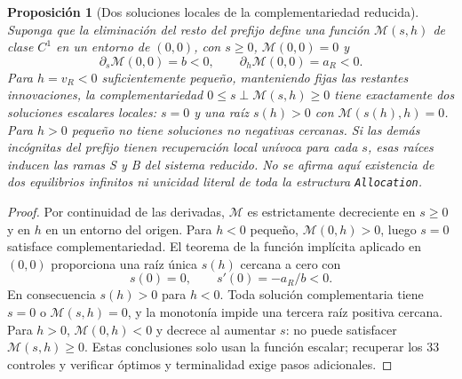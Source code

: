 \documentclass[11pt,a4paper]{article}
\numberwithin{equation}{section}
\newtheorem{proposition}{Proposición}[section]
\theoremstyle{definition}
\begin{document}
\begin{proposition}[Dos soluciones locales de la complementariedad reducida]\label{prop:local_macro_multiplicity}
Suponga que la eliminación del resto del prefijo define una función
$\mathcal M(s,h)$ de clase $C^1$ en un entorno de $(0,0)$,
con $s\geq0$, $\mathcal M(0,0)=0$ y
\[
\partial_s\mathcal M(0,0)=b<0,\qquad
\partial_h\mathcal M(0,0)=a_R<0.
\]
Para $h=v_R<0$ suficientemente pequeño, manteniendo fijas
las restantes innovaciones, la complementariedad
$0\leq s\perp\mathcal M(s,h)\geq0$ tiene exactamente dos
\emph{soluciones escalares locales}: $s=0$ y
una raíz $s(h)>0$ con $\mathcal M(s(h),h)=0$.
Para $h>0$ pequeño no tiene soluciones no negativas
cercanas. Si las demás incógnitas del prefijo tienen
recuperación local unívoca para cada $s$, esas raíces
inducen las ramas S y B del \emph{sistema reducido}.
No se afirma aquí existencia de dos equilibrios infinitos
ni unicidad literal de toda la estructura \texttt{Allocation}.
\end{proposition}
\begin{proof}
Por continuidad de las derivadas, $\mathcal M$ es
estrictamente decreciente en $s\geq0$ y en $h$ en
un entorno del origen. Para $h<0$ pequeño,
$\mathcal M(0,h)>0$, luego $s=0$ satisface
complementariedad. El teorema de la función implícita
aplicado en $(0,0)$ proporciona una raíz única
$s(h)$ cercana a cero con
\[
s(0)=0,\qquad s'(0)=-a_R/b<0.
\]
En consecuencia $s(h)>0$ para $h<0$.
Toda solución complementaria tiene $s=0$ o
$\mathcal M(s,h)=0$, y la monotonía impide
una tercera raíz positiva cercana. Para $h>0$,
$\mathcal M(0,h)<0$ y decrece al aumentar $s$:
no puede satisfacer $\mathcal M(s,h)\geq0$.
Estas conclusiones solo usan la función escalar;
recuperar los 33 controles y verificar óptimos
y terminalidad exige pasos adicionales.
\end{proof}



\clearpage
{}


\clearpage
\appendix
\renewcommand{\thesection}{A.\arabic{section}}
\renewcommand{\theHsection}{compactappendix.\arabic{section}}

\end{document}
